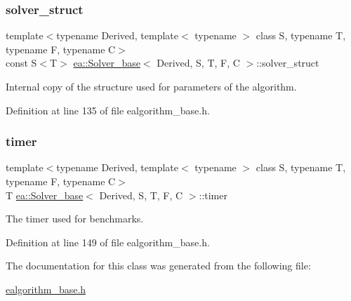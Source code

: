 \subsubsection{\texorpdfstring{solver\+\_\+struct}{solver\_struct}}
{\footnotesize\ttfamily template$<$typename Derived, template$<$ typename $>$ class S, typename T, typename F, typename C$>$ \\
const S$<$T$>$ \hyperlink{classea_1_1_solver__base}{ea\+::\+Solver\+\_\+base}$<$ Derived, S, T, F, C $>$\+::solver\+\_\+struct\hspace{0.3cm}{\ttfamily [protected]}}



Internal copy of the structure used for parameters of the algorithm. 



Definition at line 135 of file ealgorithm\+\_\+base.\+h.

\mbox{\label{classea_1_1_solver__base_ab0f0690de4b612c20b40f1b69a0e2743}} 
\subsubsection{\texorpdfstring{timer}{timer}}
{\footnotesize\ttfamily template$<$typename Derived, template$<$ typename $>$ class S, typename T, typename F, typename C$>$ \\
T \hyperlink{classea_1_1_solver__base}{ea\+::\+Solver\+\_\+base}$<$ Derived, S, T, F, C $>$\+::timer\hspace{0.3cm}{\ttfamily [protected]}}



The timer used for benchmarks. 



Definition at line 149 of file ealgorithm\+\_\+base.\+h.



The documentation for this class was generated from the following file\+:\begin{DoxyCompactItemize}
\item 
\hyperlink{ealgorithm__base_8h}{ealgorithm\+\_\+base.\+h}\end{DoxyCompactItemize}
